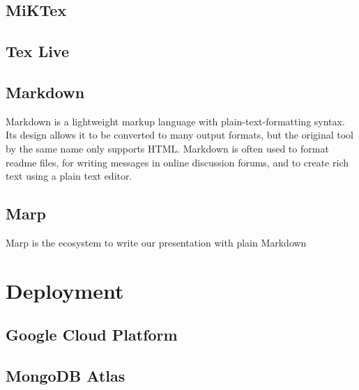 \subsection{MiKTex}

\subsection{Tex Live}



\subsection{Markdown}
Markdown is a lightweight markup language with plain-text-formatting syntax. Its design allows it to be converted to many output formats, but the original tool by the same name only supports HTML. Markdown is often used to format readme files, for writing messages in online discussion forums, and to create rich text using a plain text editor.
\subsection{Marp}
Marp is the ecosystem to write our presentation with plain Markdown
\section{Deployment}
\subsection{Google Cloud Platform}
\subsection{MongoDB Atlas}

